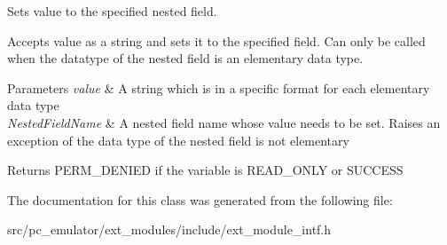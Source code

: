 Sets value to the specified nested field. 

Accepts value as a string and sets it to the specified field. Can only be called when the datatype of the nested field is an elementary data type.


\begin{DoxyParams}{Parameters}
{\em value} & A string which is in a specific format for each elementary data type \\
\hline
{\em Nested\+Field\+Name} & A nested field name whose value needs to be set. Raises an exception of the data type of the nested field is not elementary \\
\hline
\end{DoxyParams}
\begin{DoxyReturn}{Returns}
P\+E\+R\+M\+\_\+\+D\+E\+N\+I\+ED if the variable is R\+E\+A\+D\+\_\+\+O\+N\+LY or S\+U\+C\+C\+E\+SS 
\end{DoxyReturn}


The documentation for this class was generated from the following file\+:\begin{DoxyCompactItemize}
\item 
src/pc\+\_\+emulator/ext\+\_\+modules/include/ext\+\_\+module\+\_\+intf.\+h\end{DoxyCompactItemize}
